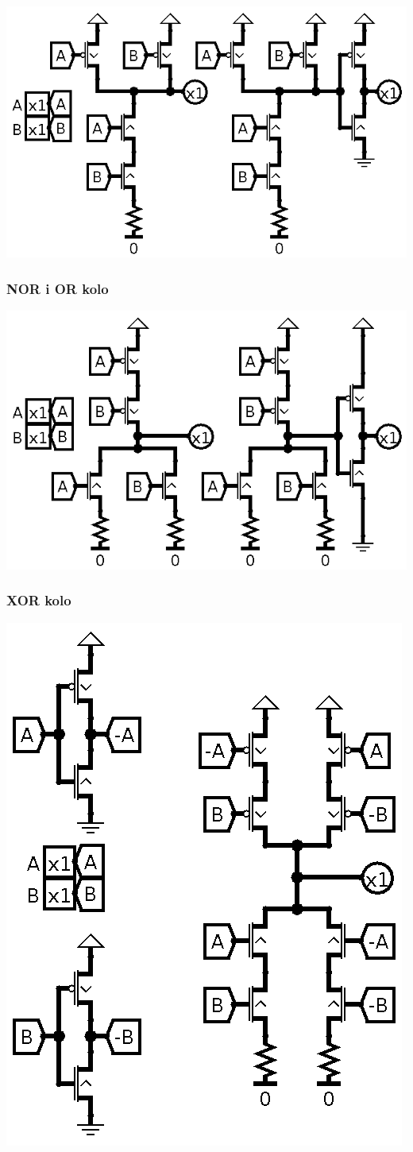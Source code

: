 \documentclass[12p,a4paper]{article}
\begin{document}
\begin{multicols}{2}
    \includegraphics[width=0.8\columnwidth]{Figures/mos_nand_and.png}

    \subsubsection{NOR i OR kolo}

    \includegraphics[width=0.8\columnwidth]{Figures/mos_nor_or.png}

    \subsubsection{XOR kolo}

    \includegraphics[width=0.7\columnwidth]{Figures/mos_xor.png}


\end{multicols}
\end{document}
